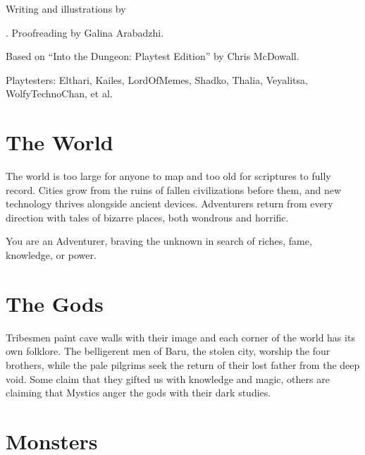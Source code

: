 \documentclass[itdr/core]{subfiles}
\begin{document}
\noindent
\begin{minipage}{\textwidth}
\toc[2] %
\end{minipage}

\vfill

\noindent
\begin{minipage}{\textwidth}
\begin{center}\small
	Writing and illustrations by \author{}. Proofreading by Galina Arabadzhi.
	
	Based on ``Into the Dungeon: Playtest Edition'' by Chris McDowall.
	
	Playtesters: Elthari, Kailes, LordOfMemes, Shadko, Thalia, Veyalitsa, WolfyTechnoChan, et al.
\end{center}
\end{minipage}

\clearpage

\label{ch:introduction}


\section*{The World}

The world is too large for anyone to map and too old for scriptures to fully record. Cities grow from the ruins of fallen civilizations before them, and new technology thrives alongside ancient devices. \mbox{Adventurers} return from every direction with tales of bizarre places, both wondrous and horrific.

You are an Adventurer, braving the unknown in search of riches, fame, knowledge, or power.

\section*{The Gods}

Tribesmen paint cave walls with their image and each corner of the world has its own folklore. The belligerent men of Baru, the stolen city, worship the four brothers, while the pale pilgrims seek the return of their lost father from the deep void. Some claim that they gifted us with knowledge and magic, others are claiming that Mystics anger the gods with their dark studies.

\section*{Monsters}
\end{document}
